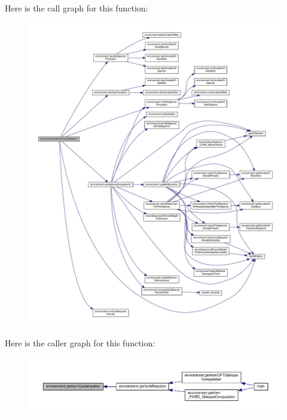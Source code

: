Here is the call graph for this function\-:\nopagebreak
\begin{figure}[H]
\begin{center}
\leavevmode
\includegraphics[width=350pt]{a00011_a1baf5512b7e0a8fb6f8f890ba9f99cd1_cgraph}
\end{center}
\end{figure}




Here is the caller graph for this function\-:\nopagebreak
\begin{figure}[H]
\begin{center}
\leavevmode
\includegraphics[width=350pt]{a00011_a1baf5512b7e0a8fb6f8f890ba9f99cd1_icgraph}
\end{center}
\end{figure}


